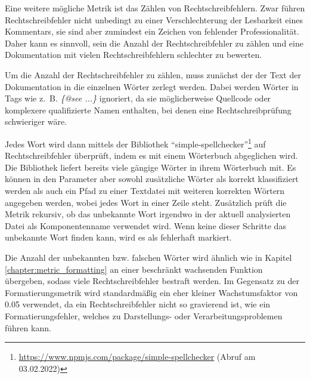  Eine weitere mögliche Metrik ist das Zählen von Rechtschreibfehlern. Zwar führen Rechtschreibfehler nicht unbedingt zu einer Verschlechterung der Lesbarkeit eines Kommentars, sie sind aber zumindest ein Zeichen von fehlender Professionalität. Daher kann es sinnvoll, sein die Anzahl der Rechtschreibfehler zu zählen und eine Dokumentation mit vielen Rechtschreibfehlern schlechter zu bewerten. 
 
 Um die Anzahl der Rechtschreibfehler zu zählen, muss zunächst der der Text der Dokumentation in die einzelnen Wörter zerlegt werden. Dabei werden Wörter in Tags wie z.~B. \textit{\{@see ...\}} ignoriert, da sie möglicherweise Quellcode oder komplexere qualifizierte Namen enthalten, bei denen eine Rechtschreibprüfung schwieriger wäre. 
 
 Jedes Wort wird dann mittels der Bibliothek  \enquote{simple-spellchecker}\footnote{\href{Simple-Spellchecker}{https://www.npmjs.com/package/simple-spellchecker} (Abruf am 03.02.2022)} auf Rechtschreibfehler überprüft, indem es mit einem Wörterbuch abgeglichen wird. Die Bibliothek liefert bereits viele gängige Wörter in ihrem Wörterbuch mit. Es können in den Parameter aber sowohl zusätzliche Wörter als korrekt klassifiziert werden als auch ein Pfad zu einer Textdatei mit weiteren korrekten Wörtern angegeben werden, wobei jedes Wort in einer Zeile steht. Zusätzlich prüft die Metrik rekursiv, ob das unbekannte Wort irgendwo in der aktuell analysierten Datei als Komponentenname verwendet wird. Wenn keine dieser Schritte das unbekannte Wort finden kann, wird es als fehlerhaft markiert. 
 
 Die Anzahl der unbekannten bzw. falschen Wörter wird ähnlich wie in Kapitel \ref{chapter:metric_formatting} an einer beschränkt wachsenden Funktion übergeben, sodass viele Rechtschreibfehler bestraft werden. Im Gegensatz zu der Formatierungsmetrik wird standardmäßig ein eher kleiner Wachstumsfaktor von 0.05 verwendet, da ein Rechtschreibfehler nicht so gravierend ist, wie ein Formatierungsfehler, welches zu Darstellungs- oder Verarbeitungsproblemen führen kann. 
 
